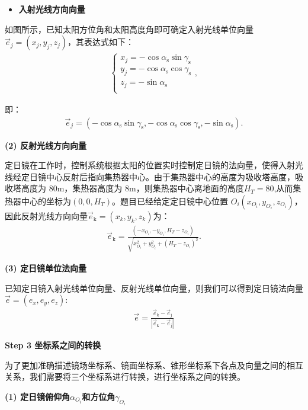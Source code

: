 \documentclass[../main.tex]{subfiles}
\begin{document}
\begin{itemize}
\item \textbf{入射光线方向向量}
\end{itemize}
\par 如图所示，已知太阳方位角和太阳高度角即可确定入射光线单位向量$\vec{e}_j =(x_j, y_j, z_j)$，其表达式如下：
\begin{align}\label{1.8}
\begin{cases}
x_j=-\cos \alpha _{\text{s}}\sin \gamma _{\text{s}}\\
y_j=-\cos \alpha _{\text{s}}\cos \gamma _{\text{s}}\\
z_j=-\sin \alpha _{\text{s}}\\
\end{cases},
\end{align}
\par 即：
\begin{align}\label{1.9}
\vec{e}_{j}=(-\cos \alpha _{\text{s}}\sin \gamma _{\text{s}}, -\cos \alpha _{\text{s}}\cos \gamma _{\text{s}}, -\sin \alpha _{\text{s}}).
\end{align}
\par \textbf{(2) 反射光线方向向量}
\par 定日镜在工作时，控制系统根据太阳的位置实时控制定日镜的法向量，使得入射光线经定日镜中心反射后指向集热器中心。由于集热器中心的高度为吸收塔高度，吸收塔高度为 80m，集热器高度为 8m，则集热器中心离地面的高度$H_T=80$,从而集热器中心的坐标为$(0,0,H_T)$。题目已经给定定日镜中心位置 \( O_i(x_{O_i}, y_{O_i}, z_{O_i}) \)，因此反射光线方向向量$\vec{e}_{\text{k}}=(x_k,y_k,z_k)$为：
\begin{align}    \label{1.10}
\vec{e}_{\text{k}} = \frac{(-x_{O_i}, -y_{O_i}, H_T - z_{O_i})}{\sqrt{x_{O_i}^2 + y_{O_i}^2 + (H_T - z_{O_i})^2}}.
\end{align}
\par \textbf{(3) 定日镜单位法向量}
\par 已知定日镜入射光线单位向量、反射光线单位向量，则我们可以得到定日镜法向量$\vec{e}=(e_x,e_y,e_z)$:
\begin{align}    \label{1.11}
\vec{e} = \frac{\vec{e}_{\text{k}} - \vec{e}_{\text{j}}}{|\vec{e}_{\text{k}} - \vec{e}_{\text{j}}|}
\end{align}



  \noindent \textbf{Step 3 坐标系之间的转换}
\par 为了更加准确描述镜场坐标系、镜面坐标系、锥形坐标系下各点及向量之间的相互关系，我们需要将三个坐标系进行转换，进行坐标系之间的转换。
\par \textbf{(1) 定日镜俯仰角$\alpha_{O_{i}}$和方位角$\gamma_{O_{i}}$}
\end{document}
